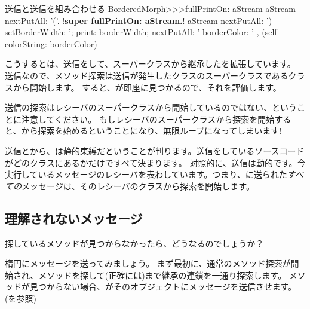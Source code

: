 \documentclass[a4paper,10pt,twoside]{book}
\begin{document}
\begin{method}[fullPrintOn]{\super 送信と\self 送信を組み合わせる}
BorderedMorph>>>fullPrintOn: aStream
	aStream nextPutAll: '('.
	!\textbf{super fullPrintOn: aStream.}!
	aStream nextPutAll: ') setBorderWidth: '; print: borderWidth;
		nextPutAll: ' borderColor: ' , (self colorString: borderColor)
\end{method}
こうするとは、\super 送信をして、スーパークラスから継承したを拡張しています。
\super 送信なので、メソッド探索は\super 送信が発生したクラスのスーパークラスであるクラスから開始します。
すると、が即座に見つかるので、それを評価します。

\super 送信の探索はレシーバのスーパークラスから開始しているのではない、ということに注意してください。
もしレシーバのスーパークラスから探索を開始すると、から探索を始めるということになり、無限ループになってしまいます!


\super 送信とから、\super は静的束縛だということが判ります。\super 送信をしているソースコードがどのクラスにあるかだけですべて決まります。
対照的に、\self 送信は動的です。今実行しているメッセージのレシーバを表わしています。つまり、\self に送られた\emph{すべての}メッセージは、そのレシーバのクラスから探索を開始します。

\subsection{理解されないメッセージ}

探しているメソッドが見つからなかったら、どうなるのでしょうか？

楕円にメッセージを送ってみましょう。
まず最初に、通常のメソッド探索が開始され、メソッドを探して(正確には)まで継承の連鎖を一通り探索します。
メソッドが見つからない場合、がそのオブジェクトにメッセージを送信させます。(を参照)
\end{document}
